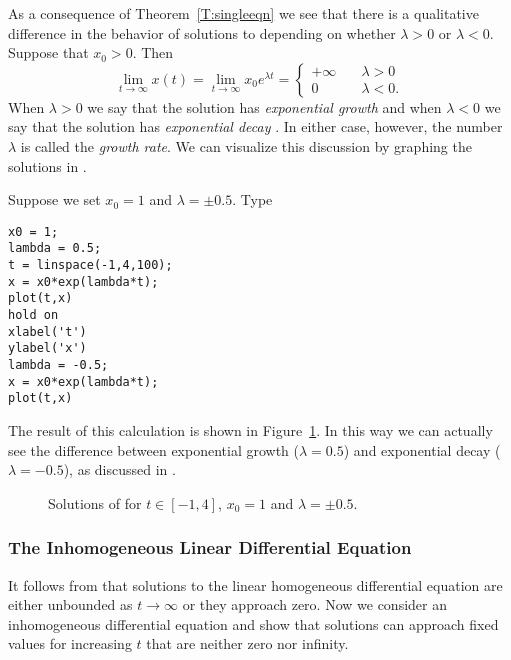 As a consequence of Theorem~\ref{T:singleeqn} we see that there
is a qualitative difference in the behavior of solutions to
 depending on whether $\lambda>0$ or $\lambda<0$.
Suppose that $x_0>0$.  Then
\begin{equation}  \label{explimits}
\lim_{t\to\infty} x(t) = \lim_{t\to\infty} x_0e^{\lambda t} =\left\{
\begin{array}{rl} +\infty & \quad\lambda>0 \\ 0 & \quad\lambda<0 . \end{array}
\right.
\end{equation}
When $\lambda>0$ we say that the solution has {\em exponential
growth\/} and when $\lambda< 0$ we say
that the solution has {\em exponential decay\/}
.  In either case, however, the
number $\lambda$ is called the {\em growth rate\/}.  We can visualize this discussion by graphing the
solutions in \Matlabp.

Suppose we set $x_0=1$ and $\lambda=\pm 0.5$.  Type
\begin{verbatim}
x0 = 1;
lambda = 0.5;
t = linspace(-1,4,100);
x = x0*exp(lambda*t);
plot(t,x)
hold on
xlabel('t')
ylabel('x')
lambda = -0.5;
x = x0*exp(lambda*t);
plot(t,x)
\end{verbatim}
The result of this calculation is shown in
Figure~\ref{graph_labelfig}.  In this way we can actually see
the difference between exponential growth ($\lambda=0.5$) and
exponential decay ($\lambda=-0.5$), as discussed in
.

\begin{figure}[htb]
     \centerline{%
     }
     \caption{Solutions of \protect{}
              for $t\in [-1,4]$, $x_0=1$ and $\lambda=\pm 0.5$.}
     \label{graph_labelfig}
\end{figure}


  \subsubsection*{The Inhomogeneous Linear Differential Equation}

It follows from  that solutions to the linear homogeneous
differential equation  are either unbounded as $t\to \infty$ or 
they approach zero.  Now we consider an inhomogeneous differential 
equation and show that solutions can approach fixed values for increasing 
$t$ that are neither zero nor infinity.

